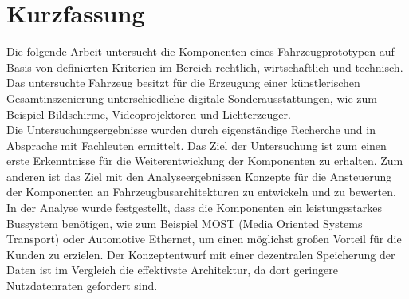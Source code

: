 \chapter*{Kurzfassung} %
Die folgende Arbeit untersucht die Komponenten eines Fahrzeugprototypen auf Basis von definierten Kriterien im Bereich rechtlich, wirtschaftlich und technisch. Das untersuchte Fahrzeug besitzt für die Erzeugung einer künstlerischen Gesamtinszenierung unterschiedliche digitale Sonderausstattungen, wie zum Beispiel Bildschirme, Videoprojektoren und Lichterzeuger. \\
Die Untersuchungsergebnisse wurden durch eigenständige Recherche und in Absprache mit Fachleuten ermittelt. Das Ziel der Untersuchung ist zum einen erste Erkenntnisse für die Weiterentwicklung der Komponenten zu erhalten. Zum anderen ist das Ziel mit den Analyseergebnissen Konzepte für die Ansteuerung der Komponenten an Fahrzeugbusarchitekturen zu entwickeln und zu bewerten. \\
In der Analyse wurde festgestellt, dass die Komponenten ein leistungsstarkes Bussystem benötigen, wie zum Beispiel MOST (Media Oriented Systems Transport) oder Automotive Ethernet, um einen möglichst großen Vorteil für die Kunden zu erzielen. Der Konzeptentwurf mit einer dezentralen Speicherung der Daten ist im Vergleich die effektivste Architektur, da dort geringere Nutzdatenraten gefordert sind.
\cleardoublepage